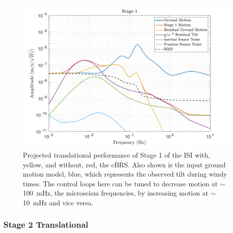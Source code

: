 \documentclass [12pt, proquest]{uwthesis}[2019]
\begin{document}
\begin{figure}[!h]
\begin{center}
\includegraphics[width=\textwidth]{cBRS_Model_ST1X.pdf}
\caption[Projected translational performance of Stage 1 of the ISI]{Projected translational performance of Stage 1 of the ISI with, yellow, and without, red, the cBRS. Also shown is the input ground motion model, blue, which represents the observed tilt during windy times. The control loops here can be tuned to decrease motion at $\sim$100~mHz, the microseism frequencies, by increasing motion at $\sim$10~mHz and vice versa.}
\label{cBRS1X}
\end{center}
\end{figure}

\subsubsection{Stage 2 Translational}
\end{document}
